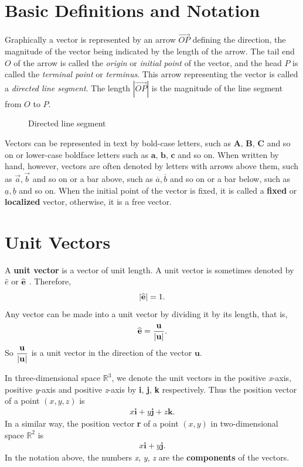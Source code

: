 \documentclass[titlepage,a4paper,12pt]{report}
\begin{document}
\section{Basic Definitions and Notation}
\noindent Graphically a vector is represented by an arrow $\overrightarrow{OP}$ defining
the direction, the magnitude of the vector being indicated by
the length of the arrow. The tail end $O$ of the arrow is called the
\textit{origin} or \textit{initial point} of the vector, and the head $P$ is called the \textit{terminal point} or \textit{terminus}. This arrow representing the vector is called a \textit{directed line segment}. The length $|\overrightarrow{OP}|$  is the magnitude of the line segment from $O$ to $P$. 
\begin{figure}[h!]

\caption{Directed line segment}
\end{figure}

\noindent Vectors can be represented in text by bold-case letters, such as $\textbf{A, B, C}$ and so on or lower-case boldface letters such as $\textbf{a, b, c}$ and so on. When written by hand, however, vectors are often denoted by letters with arrows above them, such as $\overrightarrow{a}, \overrightarrow{b}$ and so on or a bar above, such as $\overline{a}, \overline{ b}$ and so on or a bar below, such as $\underline{a}, \underline{b}$ and so on. When the initial point of the vector is fixed, it is called a \textbf{fixed} or \textbf{localized} vector, otherwise, it is a free vector.

\section{Unit Vectors}
A \textbf{unit vector} is a vector of unit length. A unit vector is sometimes denoted by $\widehat{e}$ or $\widehat{\bf{e}}$ . Therefore,
\[|\widehat{\bf{e}}| =1.\] Any vector can be made into a unit vector by dividing it by its length, that is, 
\[\widehat{\bf{e}}=\dfrac{\bf{u}}{|\bf{u}|}.\] So $\dfrac{\bf{u}}{|\bf{u}|}$ is a unit vector in the direction of the vector $\textbf{u}$.

\noindent In three-dimensional space $\mathbb{R}^3$, we denote the unit vectors in the positive \textit{x}-axis, positive \textit{y}-axis and positive \textit{z}-axis by \textbf{i}, \textbf{j}, \textbf{k} respectively. Thus the position vector of a point $(x,y,z)$ is
\begin{eqnarray}
x\textbf{i}+y\textbf{j}+z\textbf{k}.\nonumber
\end{eqnarray}
In a similar way, the position vector \textbf{r} of a point $(x,y)$ in two-dimensional space $\mathbb{R}^2$ is 
\begin{eqnarray}
x\textbf{i}+y\textbf{j}. \nonumber
\end{eqnarray}
In the notation above, the numbers \textit{x}, \textit{y}, \textit{z} are the \textbf{components} of the vectors.
\end{document}
